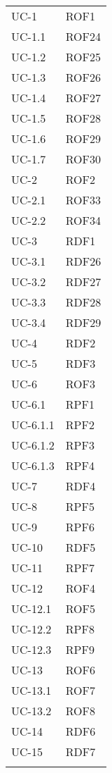 \begin{longtable}{| p{5cm} | p{5cm} |}
		UC-1 & ROF1  \\
		\rowcolor{LightGray}
		UC-1.1 & ROF24 \\
		UC-1.2 & ROF25 \\
		\rowcolor{LightGray}
		UC-1.3 & ROF26 \\
		UC-1.4 & ROF27 \\
		\rowcolor{LightGray}
		UC-1.5 & ROF28 \\
		UC-1.6 & ROF29 \\
		\rowcolor{LightGray}
		UC-1.7 & ROF30 \\		
		UC-2 & ROF2 \\
		\rowcolor{LightGray}
		UC-2.1 & ROF33 \\
		UC-2.2 & ROF34 \\
		\rowcolor{LightGray}
		UC-3 & RDF1 \\
		UC-3.1 & RDF26 \\
		\rowcolor{LightGray}
		UC-3.2 & RDF27 \\
		UC-3.3 & RDF28 \\
		\rowcolor{LightGray}
		UC-3.4 & RDF29 \\
		UC-4 & RDF2 \\
		\rowcolor{LightGray}
		UC-5 & RDF3 \\
		UC-6 & ROF3 \\
		\rowcolor{LightGray}
		UC-6.1 & RPF1 \\
		UC-6.1.1 & RPF2 \\
		\rowcolor{LightGray}
		UC-6.1.2 & RPF3 \\
		UC-6.1.3 & RPF4 \\
		\rowcolor{LightGray}
		UC-7 & RDF4 \\
		UC-8 & RPF5 \\
		\rowcolor{LightGray}
		UC-9 & RPF6 \\
		UC-10 & RDF5 \\
		\rowcolor{LightGray}
		UC-11 & RPF7 \\
		UC-12 & ROF4 \\
		\rowcolor{LightGray}
		UC-12.1 & ROF5 \\
		UC-12.2 & RPF8 \\
		\rowcolor{LightGray}
		UC-12.3 & RPF9 \\
		UC-13 & ROF6 \\
		\rowcolor{LightGray}
		UC-13.1 & ROF7 \\
		UC-13.2 & ROF8 \\
		\rowcolor{LightGray}
		UC-14 & RDF6\\
		UC-15 & RDF7 \\
		\rowcolor{LightGray}

\end{longtable}
